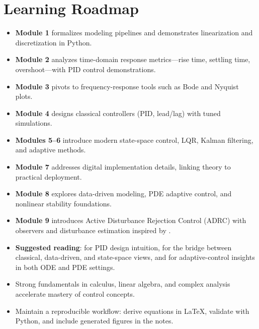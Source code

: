 \section{Learning Roadmap}
\begin{itemize}[leftmargin=*]
    \item \textbf{Module 1} formalizes modeling pipelines and demonstrates linearization and discretization in Python.
    \item \textbf{Module 2} analyzes time-domain response metrics---rise time, settling time, overshoot---with PID control demonstrations.
    \item \textbf{Module 3} pivots to frequency-response tools such as Bode and Nyquist plots.
    \item \textbf{Module 4} designs classical controllers (PID, lead/lag) with tuned simulations.
    \item \textbf{Modules 5--6} introduce modern state-space control, LQR, Kalman filtering, and adaptive methods.
    \item \textbf{Module 7} addresses digital implementation details, linking theory to practical deployment.
    \item \textbf{Module 8} explores data-driven modeling, PDE adaptive control, and nonlinear stability foundations.
    \item \textbf{Module 9} introduces Active Disturbance Rejection Control (ADRC) with observers and disturbance estimation inspired by \textcite{han2009auto,gao2006active}.
    \item \textbf{Suggested reading}: \textcite{astrom1995pid,astrom2006advanced} for PID design intuition, \textcite{ljung2012control} for the bridge between classical, data-driven, and state-space views, and \textcite{krstic1995nonlinear} for adaptive-control insights in both ODE and PDE settings.
\end{itemize}

\begin{takeaway}
\begin{itemize}[leftmargin=*]
    \item Strong fundamentals in calculus, linear algebra, and complex analysis accelerate mastery of control concepts.
    \item Maintain a reproducible workflow: derive equations in \LaTeX{}, validate with Python, and include generated figures in the notes.
\end{itemize}
\end{takeaway}

